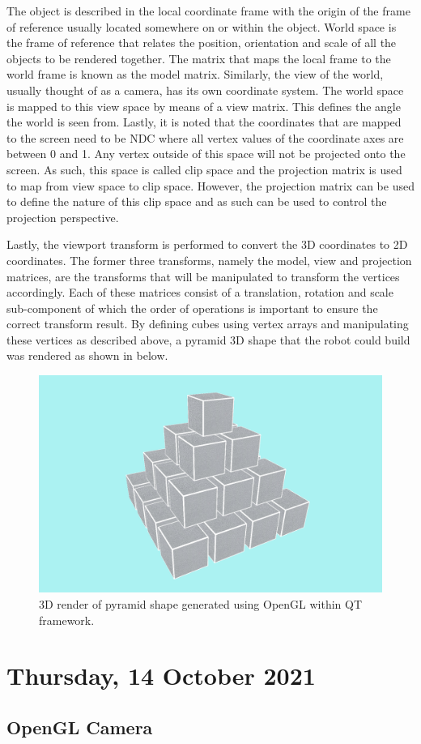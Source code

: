 The object is described in the local coordinate frame with the origin of the frame of reference usually located somewhere on or within the object. World space is the frame of reference that relates the position, orientation and scale of all the objects to be rendered together. The matrix that maps the local frame to the world frame is known as the model matrix. Similarly, the view of the world, usually thought of as a camera, has its own coordinate system. The world space is mapped to this view space by means of a view matrix. This defines the angle the world is seen from. Lastly, it is noted that the coordinates that are mapped to the screen need to be \ac{NDC} where all vertex values of the coordinate axes are between 0 and 1. Any vertex outside of this space will not be projected onto the screen. As such, this space is called clip space and the projection matrix is used to map from view space to clip space. However, the projection matrix can be used to define the nature of this clip space and as such can be used to control the projection perspective. 

Lastly, the viewport transform is performed to convert the 3D coordinates to 2D coordinates. The former three transforms, namely the model, view and projection matrices, are the transforms that will be manipulated to transform the vertices accordingly. Each of these matrices consist of a translation, rotation and scale sub-component of which the order of operations is important to ensure the correct transform result. By defining cubes using vertex arrays and manipulating these vertices as described above, a pyramid 3D shape that the robot could build was rendered as shown in  below.

\begin{figure}[H]
	\centering
	\includegraphics[width=0.8\linewidth]{figures/202110/initial-opengl-shape.PNG}
	\caption{3D render of pyramid shape generated using OpenGL within QT framework.}
	\label{fig:initial-opengl}
\end{figure}

\pendsign

\section[2021/10/14]{Thursday, 14 October 2021}

\subsection{OpenGL Camera}




\pendsign
